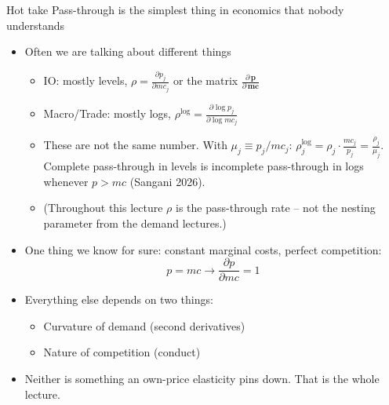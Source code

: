 \documentclass[aspectratio=169,10pt]{beamer}
\begin{document}
\begin{frame}{Hot take}
Pass-through is the simplest thing in economics that nobody understands
\begin{itemize}
\item Often we are talking about different things
\begin{itemize}
\item IO: mostly levels, $\rho = \frac{\partial p_j}{\partial mc_j}$ or the matrix $\frac{\partial\, \symbf{p}}{\partial\, \symbf{mc}}$
\item Macro/Trade: mostly logs, $\rho^{\log} = \frac{\partial \log p_j}{\partial \log mc_j}$
\item These are not the same number. With $\mu_j \equiv p_j / mc_j$: \quad $\rho^{\log}_j = \rho_j \cdot \frac{mc_j}{p_j} = \frac{\rho_j}{\mu_j}$. \\
Complete pass-through in levels \alert{is} incomplete pass-through in logs whenever $p > mc$ (Sangani 2026).
\item (Throughout this lecture $\rho$ is the \alert{pass-through rate} -- not the nesting parameter from the demand lectures.)
\end{itemize}
\item One thing we know for sure: constant marginal costs, perfect competition: \\
 $$p = mc \rightarrow \frac{\partial p}{\partial mc} = 1$$
 \item Everything else depends on two things:
\begin{itemize}
\item \alert{Curvature} of demand (second derivatives)
\item Nature of \alert{competition} (conduct)
\end{itemize}
\item Neither is something an own-price elasticity pins down. That is the whole lecture.
\end{itemize}
\end{frame}
\end{document}
